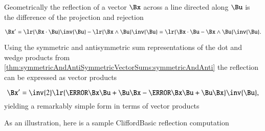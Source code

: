 %
%

Geometrically the reflection of a vector \( \Bx \) across a line directed along \( \Bu \) is the difference of the projection and rejection

\begin{dmath}\label{eqn:reflection:900}
\Bx'
= \lr{ \Bx \cdot \Bu } \inv{\Bu} - \lr{ \Bx \wedge \Bu } \inv{\Bu }
= \lr{ \Bx \cdot \Bu - \Bx \wedge \Bu } \inv{\Bu }.
\end{dmath}

Using the symmetric and antisymmetric sum representations of the dot and wedge products from
\cref{thm:symmetricAndAntiSymmetricVectorSums:symmetricAndAnti}
the reflection can be expressed as vector products

\begin{dmath}\label{eqn:reflection:940}
\Bx'
= \inv{2} \lr{ \cancel{\Bx \Bu} + \Bu \Bx - \cancel{\Bx \Bu} + \Bu \Bx } \inv{\Bu },
\end{dmath}
yielding a remarkably simple form in terms of vector products


As an illustration, here is a sample CliffordBasic reflection computation


